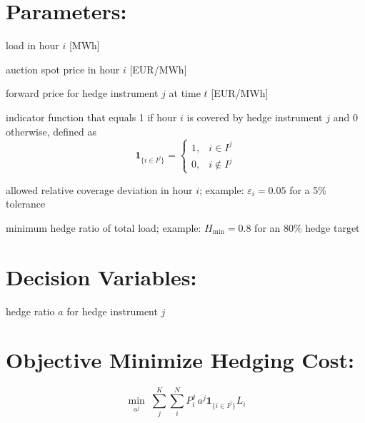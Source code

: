 \documentclass[11pt,leqno]{article}
\begin{document}
\section*{Parameters:}  
\begin{description}[widest={$\mathbf{1}_{\{i \in I^{j}\}}:$}]
  \item[$\bullet\; L_i:$] load in hour $i$ [MWh]
  \item[$\bullet\; P_i^{\text{spot}}:$] auction spot price in hour $i$ [EUR/MWh]
  \item[$\bullet\; P_t^{j}:$] forward price for hedge instrument $j$ at time $t$ [EUR/MWh]
  \item[$\bullet\; \mathbf{1}_{\{i \in I^{j}\}}:$] indicator function that equals 1 if hour $i$ is covered by hedge
    instrument $j$ and 0 otherwise, defined as
    \[
      \mathbf{1}_{\{i \in I^{j}\}} =
      \begin{cases}
        1, & i \in I^{j} \\
        0, & i \notin I^{j}
      \end{cases}
    \]
  \item[$\bullet\; \varepsilon_i:$] allowed relative coverage deviation in hour $i$; example: $\varepsilon_i = 0.05$
    for a 5\% tolerance
  \item[$\bullet\; H_{\min}:$] minimum hedge ratio of total load; example: $H_{\min} = 0.8$ for an 80\%
    hedge target
\end{description}

\section*{Decision Variables:}
\begin{description}[widest={$a^{j}:$}]
  \item[$\bullet\; a^{j}:$] hedge ratio $a$ for hedge instrument $j$
\end{description}

\section*{Objective Minimize Hedging Cost:}
\[
  \min_{a^{j}} \; \sum_{j}^{K}\sum_{i}^{N} P_t^{j} \, a^{j} \mathbf{1}_{\{i \in I^{j}\}}L_i
\]
\end{document}
